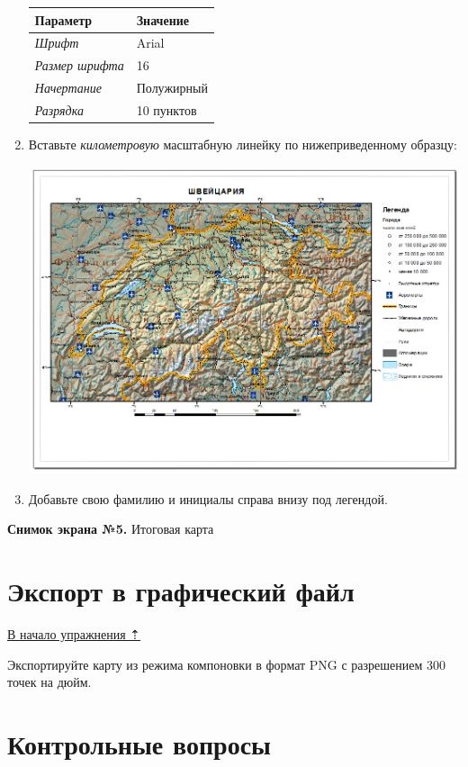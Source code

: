 \documentclass[12pt,]{book}
\begin{document}
\begin{enumerate}
  \begin{longtable}[]{@{}ll@{}}
  \toprule
  Параметр & Значение\tabularnewline
  \midrule
  \endhead
  \emph{Шрифт} & Arial\tabularnewline
  \emph{Размер шрифта} & 16\tabularnewline
  \emph{Начертание} & Полужирный\tabularnewline
  \emph{Разрядка} & 10 пунктов\tabularnewline
  \bottomrule
  \end{longtable}
\item
  Вставьте \emph{километровую} масштабную линейку по нижеприведенному образцу:

  \includegraphics{images/Ex02/image28.png}
\item
  Добавьте свою фамилию и инициалы справа внизу под легендой.
\end{enumerate}

\textbf{Снимок экрана №5.} Итоговая карта

\hypertarget{map-design-general-export}{%
\section{Экспорт в графический файл}\label{map-design-general-export}}

\protect\hyperlink{map-design-general}{В начало упражнения ⇡}

Экспортируйте карту из режима компоновки в формат PNG с разрешением 300 точек на дюйм.

\hypertarget{map-design-general-questions}{%
\section{Контрольные вопросы}\label{map-design-general-questions}}
\end{document}
